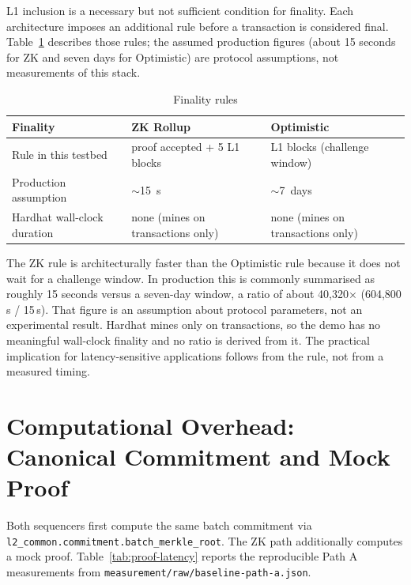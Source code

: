 L1 inclusion is a necessary but not sufficient condition for finality. Each architecture imposes an additional rule before a transaction is considered final. Table~\ref{tab:true-finality} describes those rules; the assumed production figures (about 15 seconds for ZK and seven days for Optimistic) are protocol assumptions, not measurements of this stack.

\begin{table}[htbp]
    \centering
    \small
    \setlength{\tabcolsep}{4pt}
    \begin{tabular}{@{}>{\raggedright\arraybackslash}p{3.4cm}|>{\raggedright\arraybackslash}p{4.6cm}|>{\raggedright\arraybackslash}p{4.6cm}@{}}
        \hline
        \textbf{Finality} & \textbf{ZK Rollup} & \textbf{Optimistic} \\
        \hline
        Rule in this testbed & proof accepted + 5 L1 blocks & 10 L1 blocks (challenge window) \\
        \hline
        Production assumption & $\sim$15~s & $\sim$7~days \\
        \hline
        Hardhat wall-clock duration & none (mines on transactions only) & none (mines on transactions only) \\
        \hline
    \end{tabular}
    \caption{Finality rules}
    \label{tab:true-finality}
\end{table}

The ZK rule is architecturally faster than the Optimistic rule because it does not wait for a challenge window. In production this is commonly summarised as roughly 15 seconds versus a seven-day window, a ratio of about 40,320$\times$ (604,800\,s / 15\,s). That figure is an assumption about protocol parameters, not an experimental result. Hardhat mines only on transactions, so the demo has no meaningful wall-clock finality and no ratio is derived from it. The practical implication for latency-sensitive applications follows from the rule, not from a measured timing.

\section{Computational Overhead: Canonical Commitment and Mock Proof}
\label{sec:proof}

Both sequencers first compute the same batch commitment via \texttt{l2\_common.commitment.batch\_merkle\_root}. The ZK path additionally computes a mock proof. Table~\ref{tab:proof-latency} reports the reproducible Path A measurements from \texttt{measurement/raw/baseline-path-a.json}.

